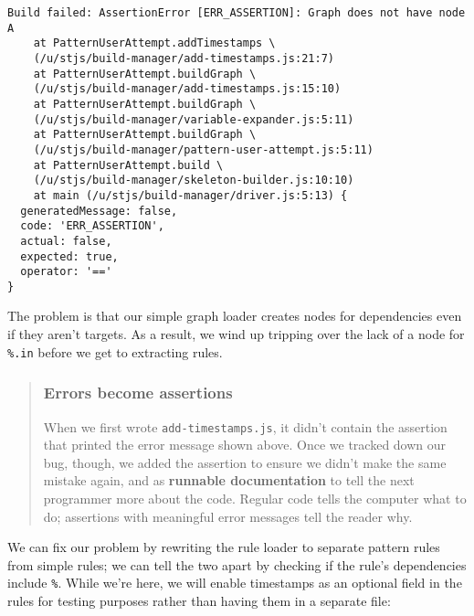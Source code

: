 \documentclass[krantzl]{krantz}
\newcommand{\glossref}[1]{\textbf{#1}}
\newenvironment{callout}{\savenotes\begin{tBox}\begin{quotation}\toggletrue{inbox}\renewcommand{\thempfootnote}{\arabic{footnote}}}{\end{quotation}\vspace{\baselineskip}\end{tBox}\togglefalse{inbox}\spewnotes}
\begin{document}
\begin{lstlisting}[frame=single,frameround=tttt]
Build failed: AssertionError [ERR_ASSERTION]: Graph does not have node A
    at PatternUserAttempt.addTimestamps \
    (/u/stjs/build-manager/add-timestamps.js:21:7)
    at PatternUserAttempt.buildGraph \
    (/u/stjs/build-manager/add-timestamps.js:15:10)
    at PatternUserAttempt.buildGraph \
    (/u/stjs/build-manager/variable-expander.js:5:11)
    at PatternUserAttempt.buildGraph \
    (/u/stjs/build-manager/pattern-user-attempt.js:5:11)
    at PatternUserAttempt.build \
    (/u/stjs/build-manager/skeleton-builder.js:10:10)
    at main (/u/stjs/build-manager/driver.js:5:13) {
  generatedMessage: false,
  code: 'ERR_ASSERTION',
  actual: false,
  expected: true,
  operator: '=='
}
\end{lstlisting}



\noindent The problem is that our simple graph loader creates nodes for dependencies even if they aren't targets.
As a result,
we wind up tripping over the lack of a node for \texttt{\%.in} before we get to extracting rules.

\begin{callout}


\subsubsection*{Errors become assertions}


When we first wrote \texttt{add-timestamps.js},
it didn't contain the assertion
that printed the error message shown above.
Once we tracked down our bug,
though,
we added the assertion to ensure we didn't make the same mistake again,
and as \glossref{runnable documentation}
to tell the next programmer more about the code.
Regular code tells the computer what to do;
assertions with meaningful error messages tell the reader why.

\end{callout}


We can fix our problem by rewriting the rule loader
to separate pattern rules from simple rules;
we can tell the two apart by checking if the rule's dependencies include \texttt{\%}.
While we're here,
we will enable timestamps as an optional field in the rules for testing purposes
rather than having them in a separate file:
\end{document}
